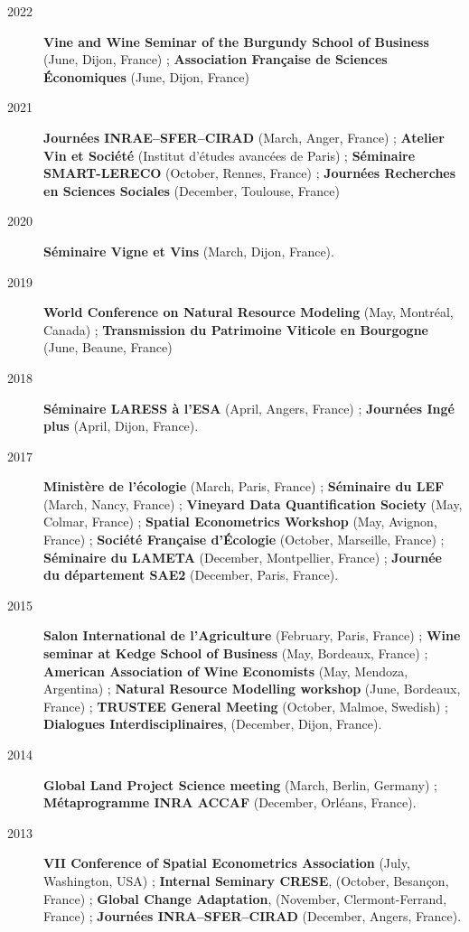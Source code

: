 \documentclass[11pt, a4paper]{./style}
\begin{document}
\begin{description}
\item[{2022}] \textbf{Vine and Wine Seminar of the Burgundy School of Business}
(June, Dijon, France) ; \textbf{Association Française de Sciences
Économiques} (June, Dijon, France)
\item[{2021}] \textbf{Journées INRAE--SFER--CIRAD} (March, Anger, France) ;
\textbf{Atelier Vin et Société} (Institut d’études avancées de Paris) ;
\textbf{Séminaire SMART-LERECO} (October, Rennes, France) ; \textbf{Journées
Recherches en Sciences Sociales} (December, Toulouse, France)
\item[{2020}] \textbf{Séminaire Vigne et Vins} (March, Dijon, France).
\item[{2019}] \textbf{World Conference on Natural Resource Modeling} (May,
Montréal, Canada) ; \textbf{Transmission du Patrimoine Viticole en
Bourgogne} (June, Beaune, France)
\item[{2018}] \textbf{Séminaire LARESS à l'ESA} (April, Angers, France) ;
\textbf{Journées Ingé plus} (April, Dijon, France).
\item[{2017}] \textbf{Ministère de l'écologie} (March, Paris, France) ;
\textbf{Séminaire du LEF} (March, Nancy, France) ; \textbf{Vineyard Data
Quantification Society} (May, Colmar, France) ; \textbf{Spatial
Econometrics Workshop} (May, Avignon, France) ; \textbf{Société Française
d'Écologie} (October, Marseille, France) ; \textbf{Séminaire du LAMETA}
(December, Montpellier, France) ; \textbf{Journée du département SAE2}
(December, Paris, France).
\item[{2015}] \textbf{Salon International de l'Agriculture} (February, Paris,
France) ; \textbf{Wine seminar at Kedge School of Business} (May,
Bordeaux, France) ; \textbf{American Association of Wine Economists}
(May, Mendoza, Argentina) ; \textbf{Natural Resource Modelling workshop}
(June, Bordeaux, France) ; \textbf{TRUSTEE General Meeting} (October,
Malmoe, Swedish) ; \textbf{Dialogues Interdisciplinaires}, (December,
Dijon, France).
\item[{2014}] \textbf{Global Land Project Science meeting} (March, Berlin,
Germany) ; \textbf{Métaprogramme INRA ACCAF} (December, Orléans, France).
\item[{2013}] \textbf{VII Conference of Spatial Econometrics Association}
(July, Washington, USA) ; \textbf{Internal Seminary CRESE}, (October,
Besançon, France) ; \textbf{Global Change Adaptation}, (November,
Clermont-Ferrand, France) ; \textbf{Journées INRA--SFER--CIRAD}
(December, Angers, France).

\end{description}
\end{document}
